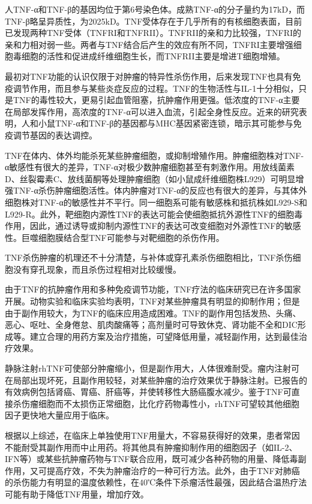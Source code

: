 人TNF-α和TNF-β的基因均位于第6号染色体。成熟TNF-α的分子量约为17kD，而TNF-β略呈异质性，为2025kD。TNF受体存在于几乎所有的有核细胞表面，目前已发现两种TNF受体（TNFRI和TNFRII）。TNFRII的亲和力比较强，TNFRI的亲和力相对弱一些。两者与TNF结合后产生的效应有所不同，TNFRI主要增强细胞毒细胞的活性和促进成纤维细胞生长，而TNFRII主要是增进T细胞增殖。

最初对TNF功能的认识仅限于对肿瘤的特异性杀伤作用，后来发现TNF也具有免疫调节作用，而且参与某些炎症反应的过程。TNF的生物活性与IL-1十分相似，只是TNF的毒性较大，更易引起血管阻塞，抗肿瘤作用更强。低浓度的TNF-α主要在局部发挥作用，高浓度的TNF-α可以进入血流，引起全身性反应。近来的研究表明，人和小鼠TNF-α和TNF-β的基因都与MHC基因紧密连锁，暗示其可能参与免疫调节基因的表达调控。

TNF在体内、体外均能杀死某些肿瘤细胞，或抑制增殖作用。肿瘤细胞株对TNF-α敏感性有很大的差异，TNF-α对极少数肿瘤细胞甚至有刺激作用。用放线菌素D、丝裂霉素C、放线菌酮等处理肿瘤细胞（如小鼠成纤维细胞株L929）可明显增强TNF-α杀伤肿瘤细胞活性。体内肿瘤对TNF-α的反应也有很大的差异，与其体外细胞株对TNF-α的敏感性并不平行。同一细胞系可能有敏感株和抵抗株如L929-S和L929-R。此外，靶细胞内源性TNF的表达可能会使细胞抵抗外源性TNF的细胞毒作用，因此，通过诱导或抑制内源性TNF的表达可改变细胞对外源性TNF的敏感性。巨噬细胞膜结合型TNF可能参与对靶细胞的杀伤作用。

TNF杀伤肿瘤的机理还不十分清楚，与补体或穿孔素杀伤细胞相比，TNF杀伤细胞没有穿孔现象，而且杀伤过程相对比较缓慢。

由于TNF的抗肿瘤作用和多种免疫调节功能，TNF疗法的临床研究已在许多国家开展。动物实验和临床实验均表明，TNF对某些肿瘤具有明显的抑制作用；但是由于副作用较大，为TNF的临床应用造成困难。TNF的副作用包括发热、头痛、恶心、呕吐、全身倦怠、肌肉酸痛等；高剂量时可导致休克、肾功能不全和DIC形成等。建立合理的用药方案及治疗措施，可望降低用量，减轻副作用，达到最佳治疗效果。

静脉注射rhTNF可使部分肿瘤缩小，但是副作用大，人体很难耐受。瘤内注射可在局部出现坏死，且副作用较轻，对某些肿瘤的治疗效果优于静脉注射。已报告的有效病例包括肾癌、胃癌、肝癌等，并使转移性大肠癌腹水减少。鉴于TNF可直接杀伤瘤细胞而不太损伤正常细胞，比化疗药物毒性小，rhTNF可望较其他细胞因子更快地大量应用于临床。

根据以上综述，在临床上单独使用TNF用量大，不容易获得好的效果，患者常因不能耐受其副作用而中止用药。将其他具有肿瘤抑制作用的细胞因子（如IL-2、IFN等）或某些抗肿瘤药物与TNF联合应用，既可减少各种药物的用量、降低毒副作用，又可提高疗效，不失为肿瘤治疗的一种可行方法。此外，由于TNF对肺癌的杀伤能力有明显的温度依赖性，在40℃条件下杀瘤活性最强，因此结合温热疗法可能有助于降低TNF用量，增加疗效。

